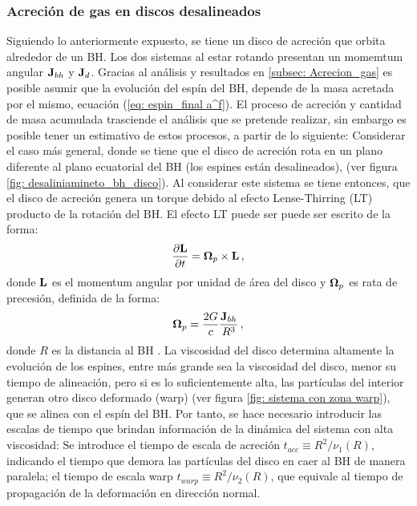     \subsubsection{Acreción de gas en discos desalineados}
    \label{subsubsec: Acrecion gas desaliniado}
Siguiendo lo anteriormente expuesto, se tiene un disco de acreción que orbita alrededor de un BH. Los dos sistemas al estar rotando presentan un momemtum angular ${\bf{J}}_{bh}$ y ${\bf{J}}_{d}$. Gracias al análisis y resultados en \ref{subsec: Acrecion_gas} es posible asumir que la evolución del espín del BH, depende de la masa acretada por el mismo, ecuación (\ref{eq: espin_final a^f}). El proceso de acreción y cantidad de masa acumulada trasciende el análisis que se pretende realizar, sin embargo es posible tener un estimativo de estos procesos, a partir de lo siguiente: Considerar el caso más general, donde se tiene que el disco de acreción rota en un plano diferente al plano ecuatorial del BH (los espines están desalineados), (ver figura \ref{fig: desaliniamineto_bh_disco}). Al considerar este sistema se tiene entonces, que el disco de acreción genera un torque debido al efecto Lense-Thirring (LT) producto de la rotación del BH. El efecto LT puede ser puede ser escrito de la forma:
%
\begin{align}
    \frac{\partial {\bf{L}}}{\partial t}={\bf{\Omega}}_{p}\times{\bf{L}}\,,
    \label{eq: lense-Thirring}
\end{align}
%
donde ${\bf{L}}$ es el momentum angular por unidad de área del disco y ${\bf{\Omega}}_{p}$ es rata de precesión, definida de la forma:
%
\begin{align}
    {\bf{\Omega}}_{p}=\frac{2G}{c}\frac{{\bf{J}}_{bh}}{R^{3}}\,,
\end{align}
%
donde $R$ es la distancia al BH \cite{pringle1992}. La viscosidad del disco determina altamente la evolución de los espines, entre más grande sea la viscosidad del disco, menor su tiempo de alineación, pero si es lo suficientemente alta, las partículas del interior generan otro disco deformado (warp) (ver figura \ref{fig: sistema con zona warp}), que se alinea con el espín del BH. Por tanto, se hace necesario introducir las escalas de tiempo que brindan información de la dinámica del sistema con alta viscosidad: Se introduce el tiempo de escala de acreción $t_{acc}\equiv R^{2}/\nu_{1}(R)$, indicando el tiempo que demora las partículas del disco en caer al BH de manera paralela; el tiempo de escala warp $t_{warp}\equiv R^{2}/\nu_{2}(R)$, que equivale al tiempo de propagación de la deformación en dirección normal.  

